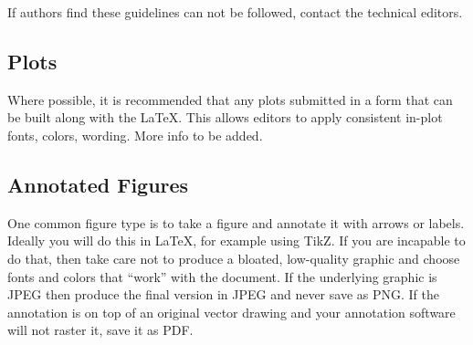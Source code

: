 \noindent If authors find these guidelines can not be followed, contact the technical editors.   

\subsection{Plots}
\label{sec:plots}

Where possible, it is recommended that any plots submitted in a form that can be built along with the \LaTeX.  This allows editors to apply consistent in-plot fonts, colors, wording.  More info to be added.

\subsection{Annotated Figures}
\label{sec:annotate}

One common figure type is to take a figure and annotate it with arrows or labels.  Ideally you will do this in LaTeX, for example using TikZ.  If you are incapable to do that, then take care not to produce a bloated, low-quality graphic and choose fonts and colors that ``work'' with the document.  If the underlying graphic is JPEG then produce the final version in JPEG and never save as PNG.  If the annotation is on top of an original vector drawing and your annotation software will not raster it, save it as PDF.


